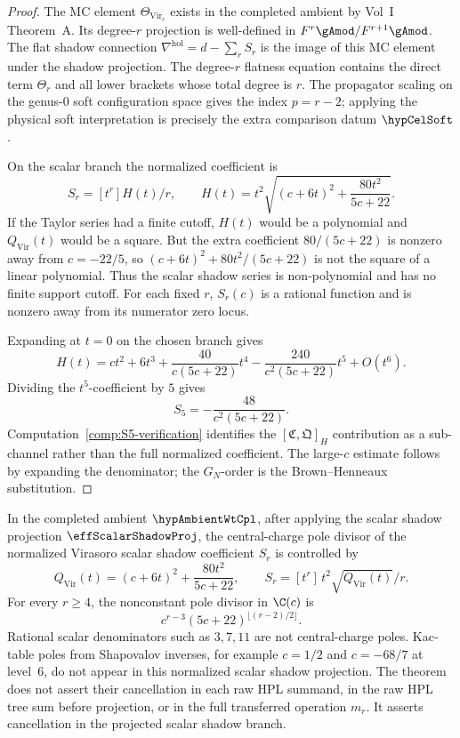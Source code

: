 \begin{proof}
The MC element \(\Theta_{\mathrm{Vir}_c}\) exists in the completed
ambient by Vol~I Theorem~A.  Its degree-\(r\) projection is well-defined
in \(F^r\gAmod/F^{r+1}\gAmod\).  The flat shadow connection
\(\nabla^{\mathrm{hol}}=d-\sum_r S_r\) is the image of this MC element
under the shadow projection.  The degree-\(r\) flatness equation
contains the direct term \(\Theta_r\) and all lower brackets whose total
degree is \(r\).  The propagator scaling on the genus-\(0\) soft
configuration space gives the index \(p=r-2\); applying the physical
soft interpretation is precisely the extra comparison datum
\(\hypCelSoft\).

On the scalar branch the normalized coefficient is
\[
S_r=[t^r]H(t)/r,\qquad
H(t)=t^2\sqrt{(c+6t)^2+\frac{80t^2}{5c+22}}.
\]
If the Taylor series had a finite cutoff, \(H(t)\) would be a
polynomial and \(Q_{\mathrm{Vir}}(t)\) would be a square.  But the
extra coefficient \(80/(5c+22)\) is nonzero away from \(c=-22/5\), so
\((c+6t)^2+80t^2/(5c+22)\) is not the square of a linear polynomial.
Thus the scalar shadow series is non-polynomial and has no finite
support cutoff.  For each fixed \(r\), \(S_r(c)\) is a rational function
and is nonzero away from its numerator zero locus.

Expanding at \(t=0\) on the chosen branch gives
\[
H(t)=ct^2+6t^3+\frac{40}{c(5c+22)}t^4
-\frac{240}{c^2(5c+22)}t^5+O(t^6).
\]
Dividing the \(t^5\)-coefficient by \(5\) gives
\[
S_5=-\frac{48}{c^2(5c+22)}.
\]
Computation~\ref{comp:S5-verification} identifies the
\([\mathfrak C,\mathfrak Q]_H\) contribution as a sub-channel rather
than the full normalized coefficient.  The large-\(c\) estimate follows
by expanding the denominator; the \(G_N\)-order is the
Brown--Henneaux substitution.
\end{proof}

\begin{theorem}
\label{thm:stasheff-cancellation}
In the completed ambient \(\hypAmbientWtCpl\), after applying the
scalar shadow projection \(\effScalarShadowProj\), the central-charge
pole divisor of the normalized Virasoro scalar shadow coefficient
\(S_r\) is controlled by
\[
Q_{\mathrm{Vir}}(t)=(c+6t)^2+\frac{80t^2}{5c+22},\qquad
S_r=[t^r]\,t^2\sqrt{Q_{\mathrm{Vir}}(t)}/r .
\]
For every \(r\ge4\), the nonconstant pole divisor in \(\C(c)\) is
\[
c^{r-3}(5c+22)^{\lfloor(r-2)/2\rfloor}.
\]
Rational scalar denominators such as \(3,7,11\) are not
central-charge poles.  Kac-table poles from Shapovalov inverses,
for example \(c=1/2\) and \(c=-68/7\) at level~\(6\), do not appear
in this normalized scalar shadow projection.  The theorem does not
assert their cancellation in each raw HPL summand, in the raw HPL tree
sum before projection, or in the full transferred operation \(m_r\).
It asserts cancellation in the projected scalar shadow branch.
\end{theorem}

